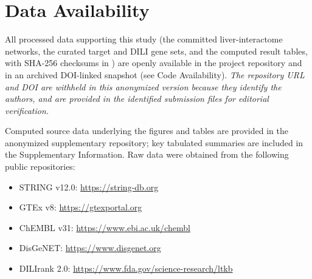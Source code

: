 \section*{Data Availability}

All processed data supporting this study (the committed liver-interactome networks, the curated target and DILI gene sets, and the computed result tables, with SHA-256 checksums in ) are openly available in the project repository and in an archived DOI-linked snapshot (see Code Availability). \textit{The repository URL and DOI are withheld in this anonymized version because they identify the authors, and are provided in the identified submission files for editorial verification.}

Computed source data underlying the figures and tables are provided in the anonymized supplementary repository; key tabulated summaries are included in the Supplementary Information. Raw data were obtained from the following public repositories:
\begin{itemize}
    \item STRING v12.0: \url{https://string-db.org}
    \item GTEx v8: \url{https://gtexportal.org}
    \item ChEMBL v31: \url{https://www.ebi.ac.uk/chembl}
    \item DisGeNET: \url{https://www.disgenet.org}
    \item DILIrank 2.0: \url{https://www.fda.gov/science-research/ltkb}
\end{itemize}
